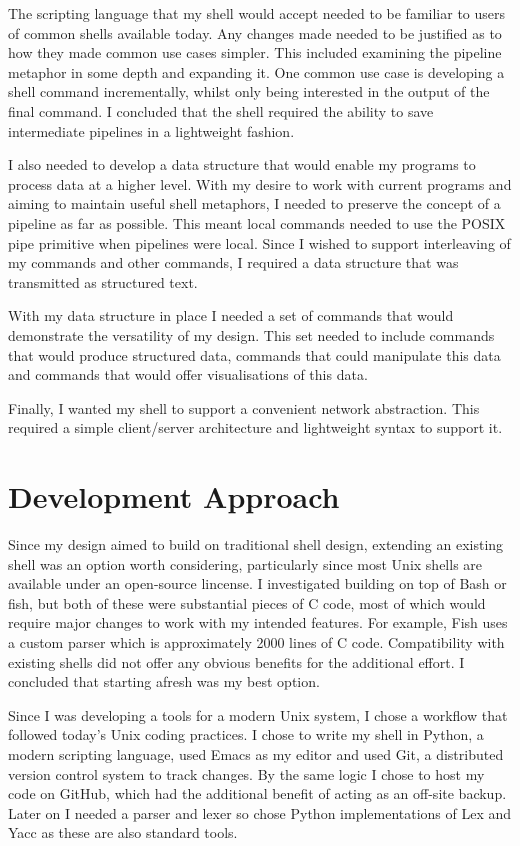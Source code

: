 \documentclass[12pt,twoside,notitlepage]{report}
\begin{document}
The scripting language that my shell would accept needed to be familiar to users
of common shells available today. Any changes made needed to be justified as to
how they made common use cases simpler. This included examining the pipeline
metaphor in some depth and expanding it. One common use case is developing a
shell command incrementally, whilst only being interested in the output of the
final command. I concluded that the shell required the ability to save
intermediate pipelines in a lightweight fashion.

I also needed to develop a data structure that would enable my programs to
process data at a higher level. With my desire to work with current programs and
aiming to maintain useful shell metaphors, I needed to preserve the concept of a
pipeline as far as possible. This meant local commands needed to use the POSIX
pipe primitive when pipelines were local. Since I wished to support interleaving
of my commands and other commands, I required a data structure that was
transmitted as structured text.

With my data structure in place I needed a set of commands that would
demonstrate the versatility of my design. This set needed to include commands
that would produce structured data, commands that could manipulate this data and
commands that would offer visualisations of this data.

Finally, I wanted my shell to support a convenient network abstraction. This
required a simple client/server architecture and lightweight syntax to
support it.

\section{Development Approach}
Since my design aimed to build on traditional shell design, extending
an existing shell was an option worth considering, particularly since
most Unix shells are available under an open-source lincense. I
investigated building on top of Bash or fish, but both of these were
substantial pieces of C code, most of which would require major
changes to work with my intended features. For example, Fish uses a
custom parser which is approximately 2000 lines of C code. Compatibility
with existing shells did not offer any obvious benefits for the
additional effort. I concluded that starting afresh was my best
option.

Since I was developing a tools for a modern Unix system, I chose a workflow that
followed today's Unix coding practices. I chose to write my shell in Python, a
modern scripting language, used Emacs as my editor and used Git, a distributed
version control system to track changes. By the same logic I chose to host my
code on GitHub, which had the additional benefit of acting as an off-site
backup. Later on I needed a parser and lexer so chose Python implementations of
Lex and Yacc as these are also standard tools.
\end{document}
